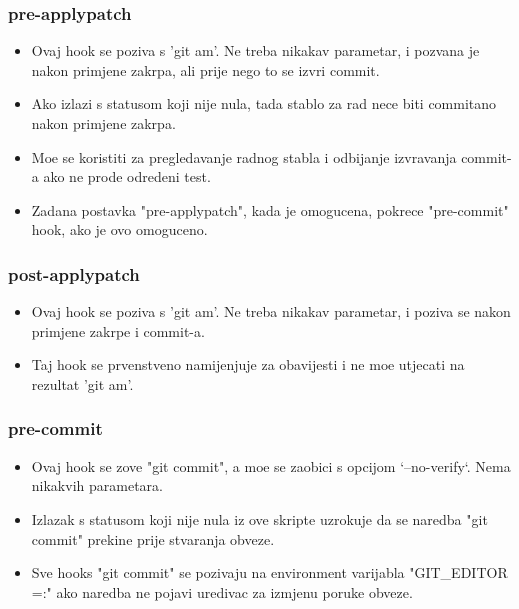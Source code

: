 \documentclass{beamer}
\begin{document}
\begin{frame}
\frametitle{pre-applypatch}
\begin{itemize}
    \item Ovaj hook se poziva s 'git am'. Ne treba nikakav parametar, i pozvana je  nakon primjene zakrpa, ali prije nego to se izvri commit.
    \item Ako izlazi s statusom koji nije nula, tada stablo za rad nece biti commitano nakon primjene zakrpa.
    \item Moe se koristiti za pregledavanje radnog stabla i odbijanje izvravanja commit-a ako ne prode odredeni test.
    \item Zadana postavka "pre-applypatch", kada je omogucena, pokrece "pre-commit" hook, ako je ovo omoguceno.
\end{itemize}
\end{frame} 

\begin{frame}
\frametitle{post-applypatch}
\begin{itemize}
    \item Ovaj hook se poziva s 'git am'. Ne treba nikakav parametar, i poziva se nakon primjene zakrpe i commit-a.
    \item Taj hook se prvenstveno namijenjuje za obavijesti i ne moe utjecati na rezultat 'git am'.
\end{itemize}
\end{frame}
	
\begin{frame}
\frametitle{pre-commit}
\begin{itemize}
    \item Ovaj hook se zove "git commit", a moe se zaobici s opcijom `--no-verify`. Nema nikakvih parametara.
    \item Izlazak s statusom koji nije nula iz ove skripte uzrokuje da se naredba "git commit" prekine prije stvaranja obveze.
    \item Sve hooks "git commit" se pozivaju na environment varijabla "GIT_EDITOR =:" ako naredba ne pojavi uredivac za izmjenu poruke obveze.
\end{itemize}
\end{frame}
	
\end{document}
